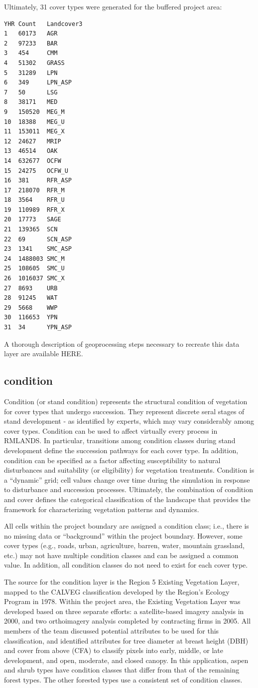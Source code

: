 Ultimately, 31 cover types were generated for the buffered project area:
\begin{verbatim}
YHR	Count	Landcover3
1	60173	AGR
2	97233	BAR
3	454		CMM
4	51302	GRASS
5	31289	LPN
6	349		LPN_ASP
7	50		LSG
8	38171	MED
9	150520	MEG_M
10	18388	MEG_U
11	153011	MEG_X
12	24627	MRIP
13	46514	OAK
14	632677	OCFW
15	24275	OCFW_U
16	381		RFR_ASP
17	218070	RFR_M
18	3564	RFR_U
19	110989	RFR_X
20	17773	SAGE
21	139365	SCN
22	69		SCN_ASP
23	1341	SMC_ASP
24	1488003	SMC_M
25	108605	SMC_U
26	1016037	SMC_X
27	8693	URB
28	91245	WAT
29	5668	WWP
30 	116653	YPN
31	34		YPN_ASP
\end{verbatim}

A thorough description of geoprocessing steps necessary to recreate this data layer are available HERE.

\subsection{condition}
Condition (or stand condition) represents the structural condition of vegetation for cover types that undergo succession. They represent discrete seral stages of stand development - as identified by experts, which may vary considerably among cover types. Condition can be used to affect virtually every process in RMLANDS. In particular, transitions among condition classes during stand development define the succession pathways for each cover type. In addition, condition can be specified as a factor affecting susceptibility to natural disturbances and suitability (or eligibility) for vegetation treatments. Condition is a “dynamic” grid; cell values change over time during the simulation in response to disturbance and succession processes. Ultimately, the combination of condition and cover defines the categorical classification of the landscape that provides the framework for characterizing vegetation patterns and dynamics.

All cells within the project boundary are assigned a condition class; i.e., there is no missing data or ``background'' within the project boundary. However, some cover types (e.g., roads, urban, agriculture, barren, water, mountain grassland, etc.) may not have multiple condition classes and can be assigned a common value. In addition, all condition classes do not need to exist for each cover type. 

The source for the condition layer is the Region 5 Existing Vegetation Layer, mapped to the CALVEG classification developed by the Region's Ecology Program in 1978. Within the project area, the Existing Vegetation Layer was developed based on three separate efforts: a satellite-based imagery analysis in 2000, and two orthoimagery analysis completed by contracting firms in 2005. All members of the team discussed potential attributes to be used for this classification, and identified attributes for tree diameter at breast height (DBH) and cover from above (CFA) to classify pixels into early, middle, or late development, and open, moderate, and closed canopy. In this application, aspen and shrub types have condition classes that differ from that of the remaining forest types. The other forested types use a consistent set of condition classes.

